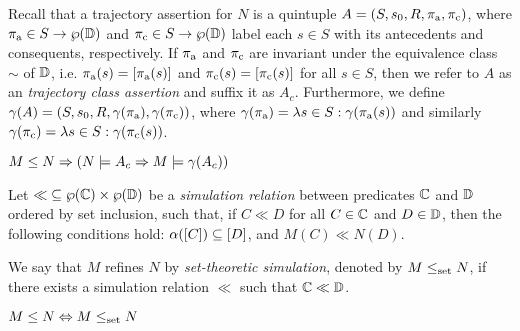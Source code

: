 
Recall that a trajectory assertion for $N$ is a quintuple $A = (S, s_{0}, R, \operatorname{\pi_{\textrm{a}}}, \operatorname{\pi_{\textrm{c}}})$, where $\operatorname{\pi_{\textrm{a}}} \in S \rightarrow \wp(\mathbb{D})$ and $\operatorname{\pi_{\textrm{c}}} \in S \rightarrow \wp(\mathbb{D})$ label each $s \in S$ with its antecedents and consequents, respectively. If $\operatorname{\pi_{\textrm{a}}}$ and $\operatorname{\pi_{\textrm{c}}}$ are invariant under the equivalence class $\sim$ of $\mathbb{D}$, i.e. $\operatorname{\pi_{\textrm{a}}}(s) = [\operatorname{\pi_{\textrm{a}}}(s)]$ and $\operatorname{\pi_{\textrm{c}}}(s) = [\operatorname{\pi_{\textrm{c}}}(s)]$ for all $s \in S$, then we refer to $A$ as an \textit{trajectory class assertion} and suffix it as $A_{c}$. Furthermore, we define $\gamma(A) = (S, s_{0}, R, \gamma(\operatorname{\pi_{\textrm{a}}}), \gamma(\operatorname{\pi_{\textrm{c}}}))$, where $\gamma(\operatorname{\pi_{\textrm{a}}}) = \lambda s \in S : \gamma(\operatorname{\pi_{\textrm{a}}}(s))$ and similarly $\gamma(\operatorname{\pi_{\textrm{c}}}) = \lambda s \in S : \gamma(\operatorname{\pi_{\textrm{c}}}(s))$.
%
\begin{theorem} \label{thm:traj-refines}
$M \leq N \Rightarrow (N \models A_{c} \Rightarrow M \models \gamma(A_{c}))$
\end{theorem}

Let ${\ll} \subseteq \wp(\mathbb{C}) \times \wp(\mathbb{D})$ be a \textit{simulation relation} between predicates $\mathbb{C}$ and $\mathbb{D}$ ordered by set inclusion, such that, if $C \ll D$ for all $C \in \mathbb{C}$ and $D \in \mathbb{D}$, then the following conditions hold: $\alpha([C]) \subseteq [D]$, and $M(C) \ll N(D)$. 

We say that $M$ refines $N$ by \textit{set-theoretic simulation}, denoted by $M \leq_{\textrm{set}} N$, if there exists a simulation relation $\ll$ such that $\mathbb{C} \ll \mathbb{D}$. 
%
\begin{theorem} \label{thm:traj-equal-set}
$M \leq N \Leftrightarrow M \leq_{\textrm{set}} N$
\end{theorem}


